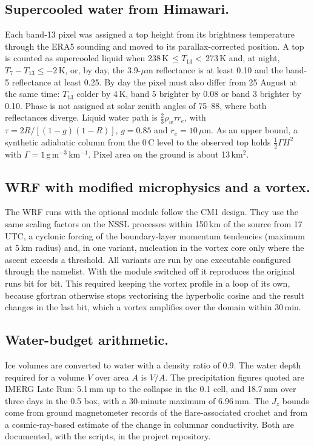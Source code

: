 \documentclass{nature}
\newcommand{\degC}{\,\textdegree C}
\begin{document}
\begin{methods}
\subsection{Supercooled water from Himawari.}
Each band-13 pixel was assigned a top height from its brightness temperature through the ERA5 sounding and moved to its parallax-corrected position. A top is counted as supercooled liquid when 238\,K\,$\le T_{13}<$\,273\,K and, at night, $T_{7}-T_{13}\le-2$\,K, or, by day, the 3.9-$\mu$m reflectance\cite{setvak1991,rosenfeld1998} is at least 0.10 and the band-5 reflectance at least 0.25. By day the pixel must also differ from 25 August at the same time: $T_{13}$ colder by 4\,K, band 5 brighter by 0.08 or band 3 brighter by 0.10. Phase is not assigned at solar zenith angles of 75--88\textdegree, where both reflectances diverge. Liquid water path is $\frac{2}{3}\rho_{w}\tau r_{e}$, with $\tau=2R/[(1-g)(1-R)]$, $g=0.85$ and $r_{e}=10\,\mu$m. As an upper bound, a synthetic adiabatic column from the 0\degC{} level to the observed top holds $\frac{1}{2}\Gamma H^{2}$ with $\Gamma=1$\,g\,m$^{-3}$\,km$^{-1}$. Pixel area on the ground is about 13\,km$^{2}$.

\subsection{WRF with modified microphysics and a vortex.}
The WRF runs with the optional module follow the CM1 design. They use the same scaling factors on the NSSL processes within 150\,km of the source from 17\,UTC, a cyclonic forcing of the boundary-layer momentum tendencies (maximum at 5\,km radius) and, in one variant, nucleation in the vortex core only where the ascent exceeds a threshold. All variants are run by one executable configured through the namelist. With the module switched off it reproduces the original runs bit for bit. This required keeping the vortex profile in a loop of its own, because gfortran otherwise stops vectorising the hyperbolic cosine and the result changes in the last bit, which a vortex amplifies over the domain within 30\,min.

\subsection{Water-budget arithmetic.}
Ice volumes are converted to water with a density ratio of 0.9. The water depth required for a volume $V$ over area $A$ is $V/A$. The precipitation figures quoted are IMERG Late Run: 5.1\,mm up to the collapse in the 0.1\textdegree{} cell, and 18.7\,mm over three days in the 0.5\textdegree{} box, with a 30-minute maximum of 6.96\,mm. The $J_z$ bounds come from ground magnetometer records of the flare-associated crochet and from a cosmic-ray-based estimate of the change in columnar conductivity. Both are documented, with the scripts, in the project repository\cite{haas2026repo}.


\end{methods}
\end{document}
